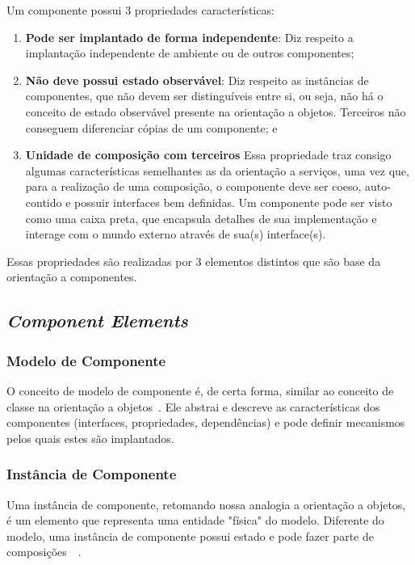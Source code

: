 Um componente possui 3 propriedades características:

\begin{enumerate}
\item \textbf{Pode ser implantado de forma independente}: Diz respeito a implantação independente de ambiente ou de outros componentes;

\item \textbf{Não deve possui estado observável}: Diz respeito as instâncias de componentes, que não devem ser distinguíveis entre si, ou seja, não há o conceito de estado observável presente na orientação a objetos. Terceiros não conseguem diferenciar cópias de um componente; e

\item \textbf{Unidade de composição com terceiros} Essa propriedade traz consigo algumas características semelhantes as da orientação a serviços, uma vez que, para a realização de uma composição, o componente deve ser coeso, auto-contido e possuir interfaces bem definidas. Um componente pode ser visto como uma caixa preta, que encapsula detalhes de sua implementação e interage com o mundo externo através de sua(s) interface(s).
\end{enumerate}

Essas propriedades são realizadas por 3 elementos distintos que são base da orientação a componentes.

\subsection{\textit{Component Elements}}
\label{sub:elements}

\subsubsection{Modelo de Componente}
O conceito de modelo de componente é, de certa forma, similar ao conceito de classe na orientação a objetos~\cite{cervantes2005technical}. Ele abstrai e descreve as características dos componentes (interfaces, propriedades, dependências) e pode definir mecanismos pelos quais estes são implantados.

\subsubsection{Instância de Componente}
Uma instância de componente, retomando nossa analogia a orientação a objetos, é um elemento que representa uma entidade "física" do modelo. Diferente do modelo, uma instância de componente possui estado e pode fazer parte de composições~\cite{cervantes2005technical}~\cite{szyperski2002component}.

